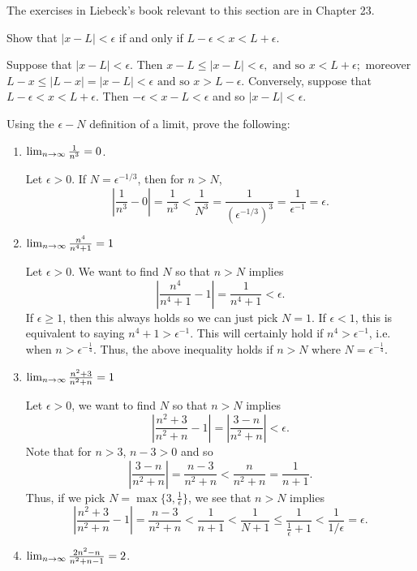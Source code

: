 \documentclass[11pt,dvipsnames]{book}
\numberwithin{equation}{section} %
\numberwithin{figure}{section} %
\numberwithin{table}{section} %
\begin{document}
The exercises in Liebeck's book relevant to this section are in Chapter 23.

\begin{exercise}\label{one}
Show that $|x- L| < \epsilon$ if and only if $L - \epsilon < x < L+ \epsilon$.
\begin{solution}
 Suppose that $|x-L|<\epsilon$. Then $
x-L\leq |x-L|<\epsilon, \mbox{ and so } x < L + \epsilon;
$
moreover 
$
L-x \leq |L-x|=|x-L|<\epsilon
\mbox{ and so } x>L-\epsilon. 
$
Conversely, suppose that $L-\epsilon<x<L+\epsilon$. Then 
$ - \epsilon < x -L < \epsilon$
and so $
|x-L|<\epsilon.$
 \end{solution}
 \end{exercise}
 
 \begin{exercise}
 Using the $\epsilon-N$ definition of a limit, prove the following:
 
\begin{enumerate}[label=(\alph*)]
\item $\lim_{n\rightarrow\infty} \frac{1}{n^{3}}=0$.
\begin{solution}
Let $\epsilon>0$. If $N=\epsilon^{-1/3}$, then for $n> N$,
\[
\left|\frac{1}{n^3}-0\right|=\frac{1}{n^3}< \frac{1}{N^3}=\frac{1}{ (\epsilon^{-1/3})^3}=\frac{1}{\epsilon^{-1}}=\epsilon.
\]
\end{solution}
\item $\lim_{n\rightarrow\infty} \frac{n^{4}}{n^{4}+1}=1$
\begin{solution}
Let $\epsilon>0$. We want to find $N$ so that $n> N$ implies
\[
\left|\frac{n^{4}}{n^{4}+1}-1\right|=\frac{1}{n^4+1}<\epsilon.
\]
If $\epsilon\geq 1$, then this always holds so we can just pick $N=1$. If $\epsilon<1$, this is equivalent to saying $n^4+1>\epsilon^{-1}$. This will certainly hold if $n^4>\epsilon^{-1}$, i.e. when $n>\epsilon^{-\frac{1}{4}}$. Thus, the above inequality holds if $n>N$ where $N=\epsilon^{-\frac{1}{4}}$.
\end{solution}
\item $\lim_{n\rightarrow\infty} \frac{n^{2}+3}{n^{2}+n}=1$
\begin{solution}
Let $\epsilon>0$, we want to find $N$ so that $n> N$ implies 
\[
\left|\frac{n^{2}+3}{n^{2}+n}-1\right|=\left|\frac{3-n}{n^2+n}\right|<\epsilon.
\]
Note that for $n> 3$, $n-3> 0$ and so 
\[
\left|\frac{3-n}{n^2+n}\right|=\frac{n-3}{n^2+n}<\frac{n}{n^2+n}=\frac{1}{n+1}.
\]
Thus, if we pick $N=\max\{3,\frac{1}{\epsilon}\}$, we see that $n> N$ implies 
\[
\left|\frac{n^{2}+3}{n^{2}+n}-1\right|=\frac{n-3}{n^2+n}<\frac{1}{n+1}< \frac{1}{N+1}\leq \frac{1}{\frac{1}{\epsilon}+1}<\frac{1}{1/\epsilon}=\epsilon.
\]
\end{solution}
\item $\lim_{n\rightarrow\infty} \frac{2n^{2}-n}{n^{2}+n-1}=2$. 


\end{enumerate}
\end{exercise}
\end{document}
